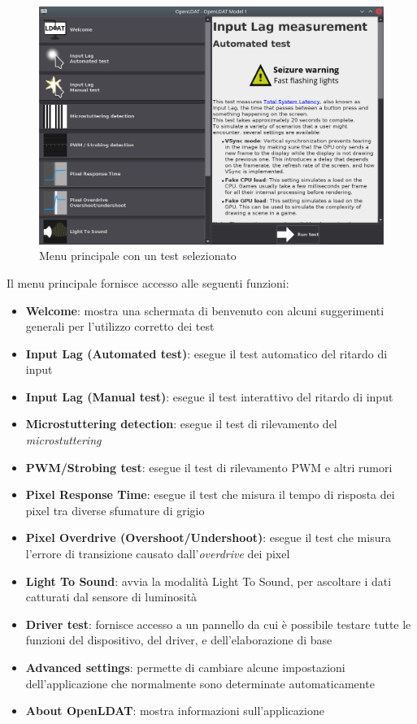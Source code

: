 \begin{figure}[h]
	\centering
	\includegraphics[width=\textwidth]{Applicazione_files/gui_mainMenu2.png}
	\caption{Menu principale con un test selezionato}
	\label{fig:gui_mainMenu2}
\end{figure}

Il menu principale fornisce accesso alle seguenti funzioni:\begin{itemize}
	\item \textbf{Welcome}: mostra una schermata di benvenuto con alcuni suggerimenti generali per l'utilizzo corretto dei test
	\item \textbf{Input Lag (Automated test)}: esegue il test automatico del ritardo di input
	\item \textbf{Input Lag (Manual test)}: esegue il test interattivo del ritardo di input
	\item \textbf{Microstuttering detection}: esegue il test di rilevamento del \textit{microstuttering}
	\item \textbf{PWM/Strobing test}: esegue il test di rilevamento PWM e altri rumori
	\item \textbf{Pixel Response Time}: esegue il test che misura il tempo di risposta dei pixel tra diverse sfumature di grigio
	\item \textbf{Pixel Overdrive (Overshoot/Undershoot)}: esegue il test che misura l'errore di transizione causato dall'\textit{overdrive} dei pixel
	\item \textbf{Light To Sound}: avvia la modalità Light To Sound, per ascoltare i dati catturati dal sensore di luminosità
	\item \textbf{Driver test}: fornisce accesso a un pannello da cui è possibile testare tutte le funzioni del dispositivo, del driver, e dell'elaborazione di base
	\item \textbf{Advanced settings}: permette di cambiare alcune impostazioni dell'applicazione che normalmente sono determinate automaticamente
	\item \textbf{About OpenLDAT}: mostra informazioni sull'applicazione
\end{itemize}

